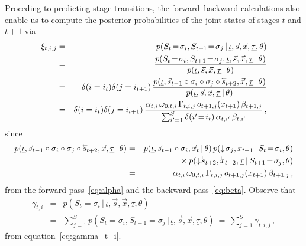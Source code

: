 \documentclass[a4paper]{article}
\newcommand{\rvec}[1]{\accentset{\leftarrow}{#1}}
\newcommand{\dn}{\downarrow\!}
\begin{document}
Proceding to predicting stage transitions, 
the forward--backward calculations also enable us to compute the posterior probabilities of the joint states of stages $t$ and $t+1$ via
\begin{eqnarray}
\xi_{t,i,j} & = &
   p(S_t\!=\!\sigma_i,S_{t+1}\!=\!\sigma_j\,|\,\underline{\iota},\vec{s},\vec{x},\underline{\tau},\theta)
\nonumber\\& = & 
   \frac{p(S_t\!=\!\sigma_i,S_{t+1}\!=\!\sigma_j,\underline{\iota},\vec{s},\vec{x},\underline{\tau}\,|\,\theta)}
        {p(\underline{\iota},\vec{s},\vec{x},\underline{\tau}\,|\,\theta)}
\nonumber\\& = & 
\delta(i=i_{t})\delta(j=i_{t+1})\,
   \frac{p(\underline{\iota},\vec{s}_{t-1}\circ\sigma_{i}\circ\sigma_{j}\circ\rvec{s}_{t+2},\vec{x},\underline{\tau}\,|\,\theta)}
        {p(\underline{\iota},\vec{s},\vec{x},\underline{\tau}\,|\,\theta)}
\nonumber\\& = & 
\delta(i=i_{t})\delta(j=i_{t+1})\,\frac{\alpha_{t,i}\,\omega_{0,t,i}\,\Gamma_{t,i,j}\,o_{t+1,j}(x_{t+1})\,\beta_{t+1,j}}
{\sum_{i'=1}^S\delta(i'\!=\!i_t)\,\alpha_{t,i'}\,\beta_{t,i'}}\,,
\label{eq:xi_t_i_j}
\end{eqnarray}
since
\begin{eqnarray}
p(\underline{\iota},\vec{s}_{t-1}\circ\sigma_{i}\circ\sigma_{j}\circ\rvec{s}_{t+2},\vec{x},\underline{\tau}\,|\,\theta)
& = &
p(\underline{\iota},\vec{s}_{t-1}\circ\sigma_{i},\vec{x}_t\,|\,\theta)\,p(\dn\sigma_j,x_{t+1}\,|\,S_{t}\!=\!\sigma_i,\theta)
\nonumber\\&&{}\times
p(\dn\rvec{s}_{t+2},\rvec{x}_{t+2},\underline{\tau}\,|\,S_{t+1}\!=\!\sigma_j,\theta)
\nonumber\\& = &
\alpha_{t,i}\,\omega_{0,t,i}\,\Gamma_{t,i,j}\,o_{t+1,j}(x_{t+1})\,\beta_{t+1,j}\,,
\end{eqnarray}
from the forward pass~\eqref{eq:alpha} and the backward pass~\eqref{eq:beta}.
Observe that
\begin{eqnarray}
   \gamma_{t,i} & = & p(S_t\!=\!\sigma_i\,|\,\underline{\iota},\vec{s},\vec{x},\underline{\tau},\theta)
\nonumber\\& = &
\sum_{j=1}^{S}p(S_t\!=\!\sigma_i,S_{t+1}\!=\!\sigma_j\,|\,\underline{\iota},\vec{s},\vec{x},\underline{\tau},\theta)
~=~\sum_{j=1}^{S}\gamma_{t,i,j}\,,
\label{eq:xi_to_gamma}
\end{eqnarray}
from equation~\eqref{eq:gamma_t_i}.
\end{document}
